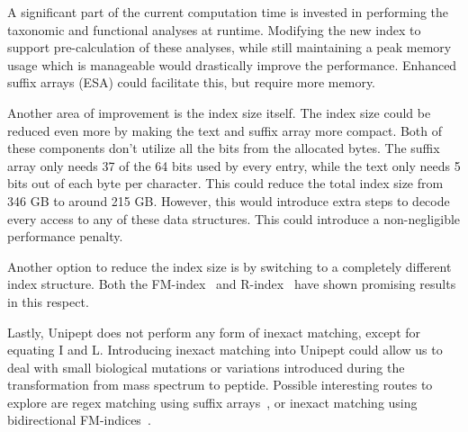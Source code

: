 \documentclass[11pt]{article}
\begin{document}
\begin{multicols}{2}
        A significant part of the current computation time is invested in performing the taxonomic and functional analyses at runtime.
        Modifying the new index to support pre-calculation of these analyses, while still maintaining a peak memory usage which is manageable would drastically improve the performance.
        Enhanced suffix arrays (ESA) could facilitate this, but require more memory.

        Another area of improvement is the index size itself.
        The index size could be reduced even more by making the text and suffix array more compact.
        Both of these components don't utilize all the bits from the allocated bytes.
        The suffix array only needs 37 of the 64 bits used by every entry, while the text only needs 5 bits out of each byte per character.
        This could reduce the total index size from 346 GB to around 215 GB\@.
        However, this would introduce extra steps to decode every access to any of these data structures.
        This could introduce a non-negligible performance penalty.

        Another option to reduce the index size is by switching to a completely different index structure.
        Both the FM-index~\cite{fm_index} and R-index~\cite{r_index} have shown promising results in this respect.

        Lastly, Unipept does not perform any form of inexact matching, except for equating I and L\@.
        Introducing inexact matching into Unipept could allow us to deal with small biological mutations or variations introduced during the transformation from mass spectrum to peptide.
        Possible interesting routes to explore are regex matching using suffix arrays~\cite{regex_sa}, or inexact matching using bidirectional FM-indices~\cite{bi-directional_fm_index}.
        \printbibliography
    \end{multicols}
\end{document}
